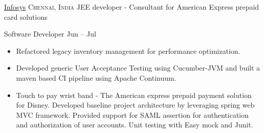 \headedsection  %
  {\href{http://www.infosys.com/}{Infosys}}
  {\textsc{Chennai, India}} 
  {\newline{}JEE developer - Consultant for American Express prepaid card solutions} 
  {%
  \headedsubsection
    {Software Developer}
    {Jun  -- Jul }
    {
      \begin{itemize}
        \item Refactored legacy inventory management for performance optimization.
        \item Developed generic User Acceptance Testing using Cucumber-JVM and built a maven based CI pipeline using Apache Continuum.
        \item Touch to pay wrist band - The American express prepaid payment solution for Disney. Developed baseline project architecture by leveraging spring web MVC framework.
              Provided support for SAML assertion for authentication and authorization of user accounts. Unit testing with Easy mock and Junit.
      \end{itemize}
  }
}
